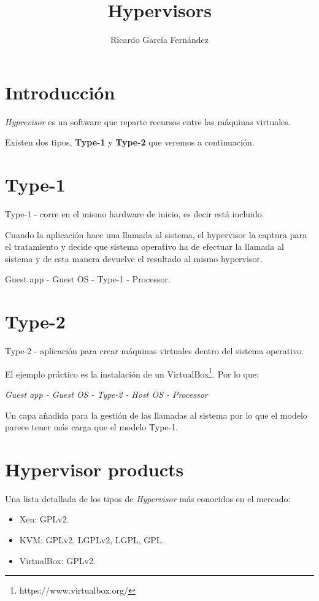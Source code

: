 \documentclass[11pt]{article}
\title{\textbf{Hypervisors}}
\author{Ricardo Garc\'ia Fern\'andez}
\date{}
\begin{document}
\maketitle

\section{Introducci\'on}

\emph{Hyprevisor} es un software que reparte recursos entre las m\'aquinas virtuales.

\par Existen dos tipos, \textbf{Type-1} y \textbf{Type-2} que veremos a continuaci\'on.

\section{Type-1}

Type-1 - corre en el mismo hardware de inicio, es decir est\'a incluido.

Cuando la aplicaci\'on hace una llamada al sistema, el hypervisor la captura para el tratamiento y decide que sistema operativo ha de efectuar la llamada al sistema y de esta manera devuelve el resultado al mismo hypervisor.

Guest app - Guest OS - Type-1 - Processor.

\section{Type-2}

\par Type-2 - aplicaci\'on para crear m\'aquinas virtuales dentro del sistema operativo.

\par El ejemplo pr\'actico es la instalaci\'on de un VirtualBox\footnote{https://www.virtualbox.org/}. Por lo que:

    \emph{Guest app - Guest OS - Type-2 - Host OS - Processor}

\par Un capa a\~nadida para la gesti\'on de las llamadas al sistema por lo que el modelo parece tener m\'as carga que el modelo Type-1.

\section{Hypervisor products}

Una lista detallada de los tipos de \emph{Hypervisor} m\'as conocidos en el mercado:
\begin{itemize}
    \item Xen: GPLv2.
    \item KVM: GPLv2, LGPLv2, LGPL, GPL.
    \item VirtualBox: GPLv2. 
\end{itemize}
\end{document}
